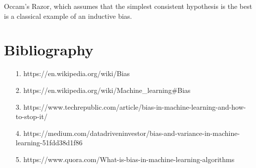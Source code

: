 \documentclass{article}
\begin{document}
    Occam's Razor, which assumes that the simplest consistent hypothesis is the best is a classical example of an inductive bias.
    
\section{Bibliography}
    
    \begin{itemize}
        \item[1.] https://en.wikipedia.org/wiki/Bias 
        \item[2.] https://en.wikipedia.org/wiki/Machine\_learning\#Bias
        \item[3.] https://www.techrepublic.com/article/bias-in-machine-learning-and-how-to-stop-it/
        \item[4.] https://medium.com/datadriveninvestor/bias-and-variance-in-machine-learning-51fdd38d1f86
        \item[5.] https://www.quora.com/What-is-bias-in-machine-learning-algorithms

    \end{itemize}
    
\end{document}
